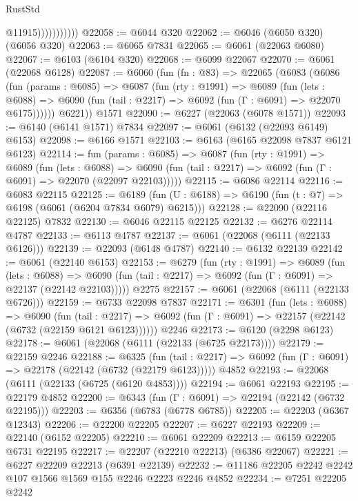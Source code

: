 \begin{lexlean}{RustStd}
\begin{coremodule}
{\begin{coremodule}
{{{{{{{{{{{{{{{{{{{{{{{{{{                          @11915)))))))))))
@22058 := @6044 @320
@22062 := @6046 (@6050 @320) (@6056 @320)
@22063 := @6065 @7831
@22065 := @6061 (@22063 @6080)
@22067 := @6103 (@6104 @320)
@22068 := @6099 @22067
@22070 := @6061 (@22068 @6128)
@22087 := @6060
    (fun (fn : @83) =>
    @22065
      (@6083
        (@6086
          (fun (params : @6085) =>
          @6087
            (fun (rty : @1991) =>
            @6089
              (fun (lets : @6088) =>
              @6090 (fun (tail : @2217) => @6092 (fun (Γ : @6091) => @22070 @6175))))))
        @6221))
    @1571
@22090 := @6227 (@22063 (@6078 @1571))
@22093 := @6140 (@6141 @1571) @7834
@22097 := @6061 (@6132 (@22093 @6149) @6153)
@22098 := @6166 @1571
@22103 := @6163 (@6165 @22098 @7837 @6121 @6123)
@22114 := fun (params : @6085) =>
  @6087
    (fun (rty : @1991) =>
    @6089
      (fun (lets : @6088) =>
      @6090 (fun (tail : @2217) => @6092 (fun (Γ : @6091) => @22070 (@22097 @22103)))))
@22115 := @6086 @22114
@22116 := @6083 @22115
@22125 := @6189 (fun (U : @6188) => @6190 (fun (t : @7) => @6198 (@6061 (@6204 @7834 @6079) @6215)))
@22128 := @22090 (@22116 @22125) @7832
@22130 := @6046 @22115 @22125
@22132 := @6276 @22114 @4787
@22133 := @6113 @4787
@22137 := @6061 (@22068 (@6111 (@22133 @6126)))
@22139 := @22093 (@6148 @4787)
@22140 := @6132 @22139
@22142 := @6061 (@22140 @6153)
@22153 := @6279
    (fun (rty : @1991) =>
    @6089
      (fun (lets : @6088) =>
      @6090 (fun (tail : @2217) => @6092 (fun (Γ : @6091) => @22137 (@22142 @22103)))))
    @2275
@22157 := @6061 (@22068 (@6111 (@22133 @6726)))
@22159 := @6733 @22098 @7837
@22171 := @6301
    (fun (lets : @6088) =>
    @6090
      (fun (tail : @2217) =>
      @6092 (fun (Γ : @6091) => @22157 (@22142 (@6732 (@22159 @6121 @6123))))))
    @2246
@22173 := @6120 (@2298 @6123)
@22178 := @6061 (@22068 (@6111 (@22133 (@6725 @22173))))
@22179 := @22159 @2246
@22188 := @6325
    (fun (tail : @2217) => @6092 (fun (Γ : @6091) => @22178 (@22142 (@6732 (@22179 @6123)))))
    @4852
@22193 := @22068 (@6111 (@22133 (@6725 (@6120 @4853))))
@22194 := @6061 @22193
@22195 := @22179 @4852
@22200 := @6343 (fun (Γ : @6091) => @22194 (@22142 (@6732 @22195)))
@22203 := @6356 (@6783 (@6778 @6785))
@22205 := @22203 (@6367 @12343)
@22206 := @22200 @22205
@22207 := @6227 @22193
@22209 := @22140 (@6152 @22205)
@22210 := @6061 @22209
@22213 := @6159 @22205 @6731 @22195
@22217 := @22207 (@22210 @22213) (@6386 @22067)
@22221 := @6227 @22209 @22213 (@6391 @22139)
@22232 := @11186 @22205 @2242 @2242 @107 @1566 @1569 @155 @2246 @2223 @2246 @4852
@22234 := @7251 @22205 @2242
}}}}}}}}}}}}}}}}}}}}}}}}}}
\end{coremodule}}
\end{coremodule}
\end{lexlean}
